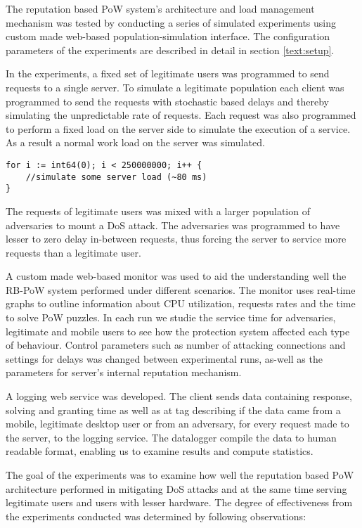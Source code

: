 The reputation based PoW system's architecture and load management mechanism was tested by conducting a series of simulated experiments using custom made web-based population-simulation interface. The configuration parameters of the experiments are described in detail in section \ref{text:setup}.

In the experiments, a fixed set of legitimate users was programmed to send requests to a single server. To simulate a legitimate population each client was programmed to send the requests with stochastic based delays and thereby simulating the unpredictable rate of requests. Each request was also programmed to perform a fixed load on the server side to simulate the execution of a service. As a result a normal work load on the server was simulated. 
\begin{verbatim}	
for i := int64(0); i < 250000000; i++ {
	//simulate some server load (~80 ms)
}
\end{verbatim}
The requests of legitimate users was mixed with a larger population of adversaries to mount a DoS attack. The adversaries was programmed to have lesser to zero delay in-between requests, thus forcing the server to service more requests than a legitimate user. 

A custom made web-based monitor was used to aid the understanding well the RB-PoW system performed under different scenarios. The monitor uses real-time graphs to outline information about CPU utilization, requests rates and the time to solve PoW puzzles. In each run we studie the service time for adversaries, legitimate and mobile users to see how the protection system affected each type of behaviour. Control parameters such as number of attacking connections and settings for delays was changed between experimental runs, as-well as the parameters for server's internal reputation mechanism.

A logging web service was developed. The client sends data containing response, solving and granting time as well as at tag describing if the data came from a mobile, legitimate desktop user or from an adversary,  for every request made to the server, to the logging service. The datalogger compile the data to human readable format, enabling us to examine results and compute statistics.

The goal of the experiments was to examine how well the reputation based PoW architecture performed in mitigating DoS attacks and at the same time serving legitimate users and users with lesser hardware. The degree of effectiveness from the experiments conducted was determined by following observations:

